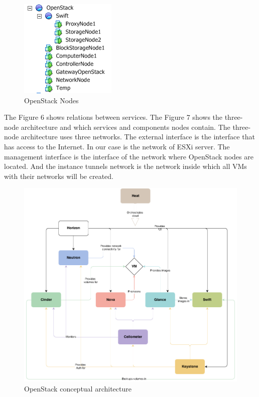 \begin{figure}[ht!]
\centering
\includegraphics{openstack_tree.png}
\caption{OpenStack Nodes}
\label{overflow}
\end{figure}

The Figure 6 shows relations between services. The Figure 7 shows the three-node architecture and which services and components nodes contain. The three-node  architecture uses three networks. The external interface is the interface that has access to the Internet. In our case is the network of ESXi server. The management interface is the interface of the network where OpenStack nodes are located. And the instance tunnels network is the network inside which all VMs with their networks will be created. 




\begin{figure}[ht!]
\centering
\includegraphics[width=\textwidth]{openstack_conceptual_architecture.png}
\caption{OpenStack conceptual architecture}
\label{overflow}
\end{figure}


